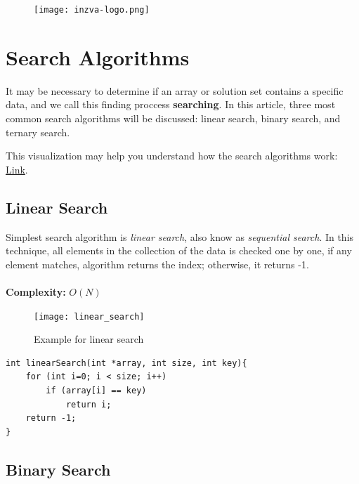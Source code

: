 \documentclass[12pt]{article}
\title{\vspace{-2em}\mytitle\vspace{-0.3em}}
\author{
	\textbf{Editor}\\
	Kadir Emre Oto  \\ \ \\ 
	\textbf{Reviewers} \\ 
	Muhammed Burak Buğrul  \\
	Tahsin Enes Kuru \\ \ \\
    \textbf{Contributors} \\ 
	Aybala Karakaya  \\
}
\date{}
\begin{document}
	
	\begin{figure}
		\centering
		\texttt{[image: inzva-logo.png]}
		\label{fig:inzva}
	\end{figure}
	\maketitle
	
	\cleardoublepage
	\tableofcontents
	\cleardoublepage
	
	\section{Search Algorithms}
	
It may be necessary to determine if an array or solution set contains a specific data, and we call this finding proccess \textbf{searching}. In this article, three most common search algorithms will be discussed: linear search, binary search, and ternary search.

This visualization may help you understand how the search algorithms work: \href{https://www.cs.usfca.edu/~galles/visualization/Search.html}{Link}. 

		\subsection{Linear Search}
			
Simplest search algorithm is \textit{linear search}, also know as \textit{sequential search}. In this technique, all elements in the collection of the data is checked one by one, if any element matches, algorithm returns the index; otherwise, it returns -1. \\ \\
\textbf{Complexity: }
    $O(N)$

\begin{figure}[h]
	\centering
	\texttt{[image: linear\_search]}
	\caption{Example for linear search}
	\label{fig:linear_search}
\end{figure}


\begin{verbatim}
int linearSearch(int *array, int size, int key){
    for (int i=0; i < size; i++)
        if (array[i] == key)
            return i;
    return -1;
}
\end{verbatim}

\cleardoublepage
	
		\subsection{Binary Search}
			
\end{document}
